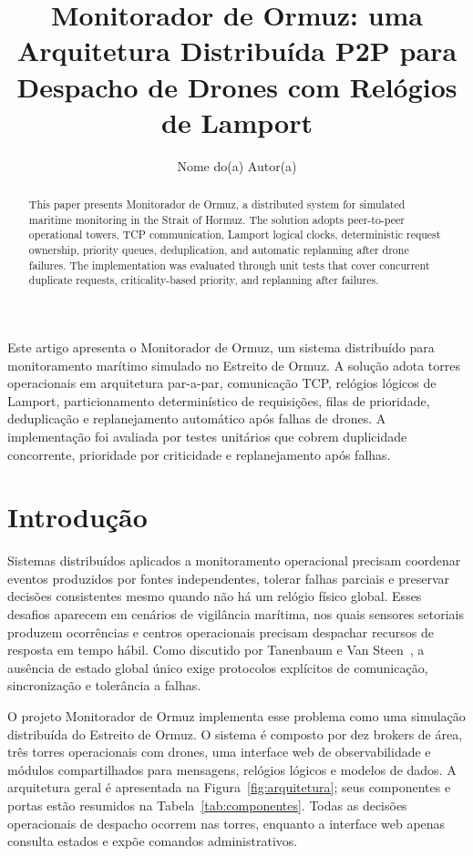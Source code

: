 \documentclass[12pt]{article}
\title{Monitorador de Ormuz: uma Arquitetura Distribuída P2P para Despacho de Drones com Relógios de Lamport}
\author{Nome do(a) Autor(a)\inst{1}}
\begin{document}
\maketitle

\begin{abstract}
  This paper presents Monitorador de Ormuz, a distributed system for simulated maritime monitoring in the Strait of Hormuz. The solution adopts peer-to-peer operational towers, TCP communication, Lamport logical clocks, deterministic request ownership, priority queues, deduplication, and automatic replanning after drone failures. The implementation was evaluated through unit tests that cover concurrent duplicate requests, criticality-based priority, and replanning after failures.
\end{abstract}

\begin{resumo}
  Este artigo apresenta o Monitorador de Ormuz, um sistema distribuído para monitoramento marítimo simulado no Estreito de Ormuz. A solução adota torres operacionais em arquitetura par-a-par, comunicação TCP, relógios lógicos de Lamport, particionamento determinístico de requisições, filas de prioridade, deduplicação e replanejamento automático após falhas de drones. A implementação foi avaliada por testes unitários que cobrem duplicidade concorrente, prioridade por criticidade e replanejamento após falhas.
\end{resumo}

\section{Introdução}

Sistemas distribuídos aplicados a monitoramento operacional precisam coordenar eventos produzidos por fontes independentes, tolerar falhas parciais e preservar decisões consistentes mesmo quando não há um relógio físico global. Esses desafios aparecem em cenários de vigilância marítima, nos quais sensores setoriais produzem ocorrências e centros operacionais precisam despachar recursos de resposta em tempo hábil. Como discutido por Tanenbaum e Van Steen~\cite{tanenbaum2017distributed}, a ausência de estado global único exige protocolos explícitos de comunicação, sincronização e tolerância a falhas.

O projeto Monitorador de Ormuz implementa esse problema como uma simulação distribuída do Estreito de Ormuz. O sistema é composto por dez brokers de área, três torres operacionais com drones, uma interface web de observabilidade e módulos compartilhados para mensagens, relógios lógicos e modelos de dados. A arquitetura geral é apresentada na Figura~\ref{fig:arquitetura}; seus componentes e portas estão resumidos na Tabela~\ref{tab:componentes}. Todas as decisões operacionais de despacho ocorrem nas torres, enquanto a interface web apenas consulta estados e expõe comandos administrativos.
\end{document}
